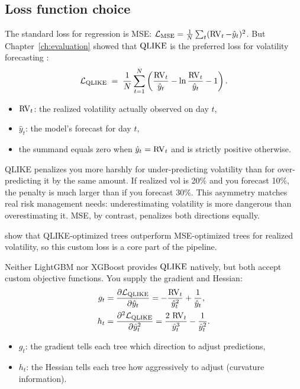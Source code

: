 \subsection*{Loss function choice}

The standard loss for regression is MSE:
$\mathcal{L}_{\text{MSE}} = \frac{1}{N}\sum_t (\operatorname{RV}_t - \hat{y}_t)^2$.
But Chapter~\ref{ch:evaluation} showed that $\operatorname{QLIKE}$ is the preferred loss
for volatility forecasting \citep{AudrinoKnaus2016}:
\begin{equation}\label{eq:trees:qlike}
  \mathcal{L}_{\operatorname{QLIKE}} \;=\; \frac{1}{N}\sum_{t=1}^{N}
  \left(\frac{\operatorname{RV}_t}{\hat{y}_t} - \ln\frac{\operatorname{RV}_t}{\hat{y}_t} - 1\right).
\end{equation}
\begin{itemize}[nosep]
  \item $\operatorname{RV}_t$: the realized volatility actually observed on day $t$,
  \item $\hat{y}_t$: the model's forecast for day $t$,
  \item the summand equals zero when $\hat{y}_t = \operatorname{RV}_t$ and is strictly
        positive otherwise.
\end{itemize}

\begin{intuition}
QLIKE penalizes you more harshly for under-predicting volatility than for
over-predicting it by the same amount.  If realized vol is 20\% and you
forecast 10\%, the penalty is much larger than if you forecast 30\%.  This
asymmetry matches real risk management needs: underestimating volatility is
more dangerous than overestimating it.  MSE, by contrast, penalizes both
directions equally.
\end{intuition}

\begin{projectconnection}
\citet{AudrinoKnaus2016} show that QLIKE-optimized trees outperform
MSE-optimized trees for realized volatility, so this custom loss is a core
part of the pipeline.
\end{projectconnection}

Neither LightGBM nor XGBoost provides $\operatorname{QLIKE}$ natively, but both accept
custom objective functions.  You supply the gradient and Hessian:
\begin{align}
  g_t &= \frac{\partial \mathcal{L}_{\operatorname{QLIKE}}}{\partial \hat{y}_t}
       = -\frac{\operatorname{RV}_t}{\hat{y}_t^2} + \frac{1}{\hat{y}_t}, \label{eq:trees:qlike_grad}\\
  h_t &= \frac{\partial^2 \mathcal{L}_{\operatorname{QLIKE}}}{\partial \hat{y}_t^2}
       = \frac{2\,\operatorname{RV}_t}{\hat{y}_t^3} - \frac{1}{\hat{y}_t^2}. \label{eq:trees:qlike_hess}
\end{align}
\begin{itemize}[nosep]
  \item $g_t$: the gradient tells each tree which direction to adjust
        predictions,
  \item $h_t$: the Hessian tells each tree how aggressively to adjust
        (curvature information).
\end{itemize}

